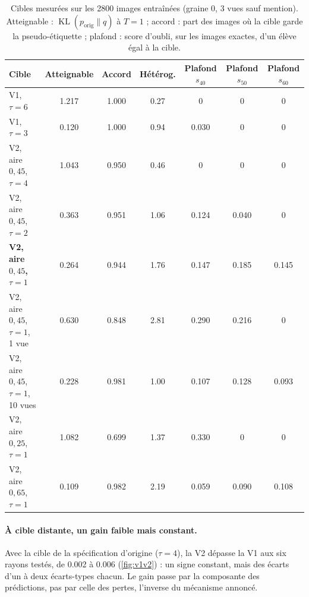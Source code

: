 \documentclass[11pt,a4paper]{article}
\newcommand{\KL}{\operatorname{KL}}
\newcommand{\orig}{\mathrm{orig}}
\begin{document}
\begin{table}[ht]
  \centering\small
  \caption{Cibles mesurées sur les 2800 images entraînées (graine 0, 3 vues sauf mention).
  Atteignable : $\KL(p_\orig\|q)$ à $T=1$ ; accord : part des images où la cible garde la
  pseudo-étiquette ; plafond : score d'oubli, sur les images exactes, d'un élève égal à la
  cible.}\label{tab:ciblev2}
  \setlength{\tabcolsep}{4.5pt}
  \begin{tabular}{@{}l S S S[table-format=1.2] SSS@{}}
    \toprule
    Cible & {Atteignable} & {Accord} & {Hétérog.} & {Plafond $s_{40}$} & {Plafond $s_{50}$}
      & {Plafond $s_{60}$}\\
    \midrule
    V1, $\tau=6$ & 1.217 & 1.000 & 0.27 & 0 & 0 & 0\\
    V1, $\tau=3$ & 0.120 & 1.000 & 0.94 & 0.030 & 0 & 0\\
    V2, aire $0{,}45$, $\tau=4$ & 1.043 & 0.950 & 0.46 & 0 & 0 & 0\\
    V2, aire $0{,}45$, $\tau=2$ & 0.363 & 0.951 & 1.06 & 0.124 & 0.040 & 0\\
    \textbf{V2, aire $0{,}45$, $\tau=1$} & 0.264 & 0.944 & 1.76 & 0.147 & 0.185 & 0.145\\
    V2, aire $0{,}45$, $\tau=1$, 1 vue & 0.630 & 0.848 & 2.81 & 0.290 & 0.216 & 0\\
    V2, aire $0{,}45$, $\tau=1$, 10 vues & 0.228 & 0.981 & 1.00 & 0.107 & 0.128 & 0.093\\
    V2, aire $0{,}25$, $\tau=1$ & 1.082 & 0.699 & 1.37 & 0.330 & 0 & 0\\
    V2, aire $0{,}65$, $\tau=1$ & 0.109 & 0.982 & 2.19 & 0.059 & 0.090 & 0.108\\
    \bottomrule
  \end{tabular}
\end{table}

\paragraph{À cible distante, un gain faible mais constant.} Avec la cible de la spécification
d'origine ($\tau=4$), la V2 dépasse la V1 aux six rayons testés, de \num{0.002} à \num{0.006}
(\cref{fig:v1v2}) : un signe constant, mais des écarts d'un à deux écarts-types chacun. Le gain
passe par la composante des prédictions, pas par celle des pertes, l'inverse du mécanisme annoncé.
\end{document}
